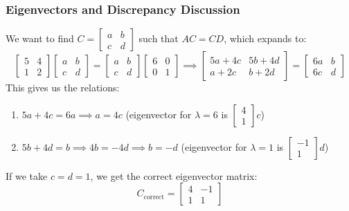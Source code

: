 \documentclass[12pt,a4paper]{report}
\theoremstyle{definition}
\numberwithin{equation}{chapter}
\begin{document}
\subsubsection*{Eigenvectors and Discrepancy Discussion}
We want to find $C = \begin{bmatrix} a & b \\ c & d \end{bmatrix}$ such that $AC = CD$, which expands to:
\begin{equation}
\begin{bmatrix} 5 & 4 \\ 1 & 2 \end{bmatrix} \begin{bmatrix} a & b \\ c & d \end{bmatrix} = \begin{bmatrix} a & b \\ c & d \end{bmatrix} \begin{bmatrix} 6 & 0 \\ 0 & 1 \end{bmatrix} \implies \begin{bmatrix} 5a+4c & 5b+4d \\ a+2c & b+2d \end{bmatrix} = \begin{bmatrix} 6a & b \\ 6c & d \end{bmatrix}
\end{equation}
This gives us the relations:
\begin{enumerate}
    \item $5a + 4c = 6a \implies a = 4c$ (eigenvector for $\lambda = 6$ is $\begin{bmatrix} 4 \\ 1 \end{bmatrix} c$)
    \item $5b + 4d = b \implies 4b = -4d \implies b = -d$ (eigenvector for $\lambda = 1$ is $\begin{bmatrix} -1 \\ 1 \end{bmatrix} d$)
\end{enumerate}
If we take $c = d = 1$, we get the correct eigenvector matrix:
\begin{equation}
C_{\text{correct}} = \begin{bmatrix} 4 & -1 \\ 1 & 1 \end{bmatrix}
\end{equation}
\end{document}
